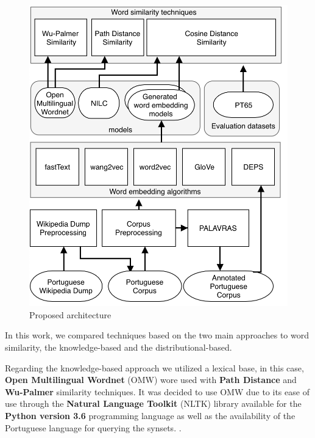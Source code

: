 \begin{figure}[h]
    \caption{Proposed architecture}
    \label{fig:arq}
    \centering%
    \begin{minipage}{.8\textwidth}
        \includegraphics[width=\textwidth]{arq.png}
    \end{minipage}
\end{figure}


In this work, we compared techniques based on the two main approaches to word similarity, the knowledge-based and the distributional-based. 

Regarding the knowledge-based approach we utilized a lexical base, in this case, \textbf{Open Multilingual Wordnet} (OMW) wore used with \textbf{Path Distance} and \textbf{Wu-Palmer} similarity techniques. It was decided to use OMW due to its ease of use through the \textbf{Natural Language Toolkit} (NLTK) library available for the \textbf{Python version 3.6} programming language as well as the availability of the Portuguese language for querying the synsets. \cite{Bond2013LinkingAE}.


